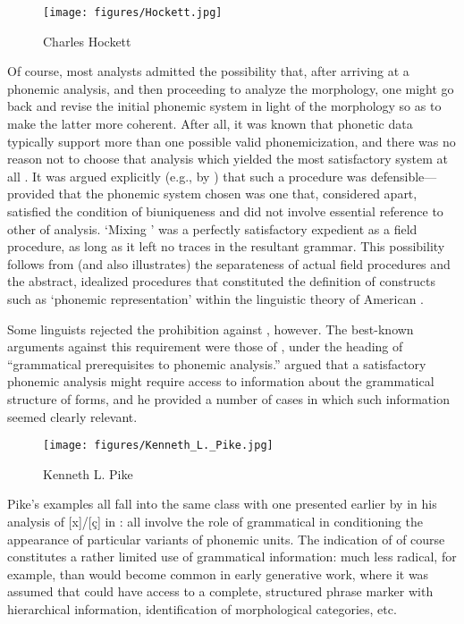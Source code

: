 \begin{wrapfigure}[13]{r}{.35\textwidth}
  \texttt{[image: figures/Hockett.jpg]}
  \caption{Charles Hockett}
  \label{fig:ch.structuralists.hockett}
\end{wrapfigure}
Of course, most analysts admitted the possibility that, after arriving
at a phonemic analysis, and then proceeding to analyze the morphology,
one might go back and revise the initial phonemic system in light of
the morphology so as to make the latter more coherent. After all, it
was known \citep{chao34:non-uniqueness} that phonetic data typically
support more than one possible valid phonemicization, and there was no
reason not to choose that analysis which yielded the most satisfactory
system at all . It was argued explicitly (e.g., by
\citealt{hockett47:problems}) that such a procedure was
defensible—provided that the phonemic system chosen was one that,
considered apart, satisfied the condition of biuniqueness and did not
involve essential reference to other  of analysis. `Mixing
' was a perfectly satisfactory expedient as a field procedure,
as long as it left no traces in the resultant grammar. This
possibility follows from (and also illustrates) the separateness of
actual field procedures and the abstract, idealized procedures that
constituted the definition of constructs such as `phonemic
representation' within the linguistic theory of American
.


\largerpage
Some linguists rejected the prohibition against ,
however. The best-known arguments against this requirement were those
of \citet{pike47:gppa,pike52:mogp}, under the heading of ``grammatical
prerequisites to phonemic analysis.'' {\Pike} argued that a satisfactory
phonemic analysis might require access to information about the
grammatical structure of forms, and he provided a number of cases in
which such information seemed clearly relevant.

\begin{wrapfigure}{l}{.45\textwidth}
  \texttt{[image: figures/Kenneth\_L.\_Pike.jpg]}
  \caption{Kenneth L. Pike}
  \label{fig:ch.structuralists.pike}
\end{wrapfigure}
Pike's examples all fall into the same class with one presented
earlier by {\Bloomfield} in his analysis of [x]/[ç] in : all
involve the role of grammatical  in conditioning the
appearance of particular variants of phonemic units. The indication of
 of course constitutes a rather limited use of grammatical
information: much less radical, for example, than would become common
in early generative work, where it was assumed that 
could have access to a complete, structured phrase marker with
hierarchical information, identification of morphological categories,
etc.

